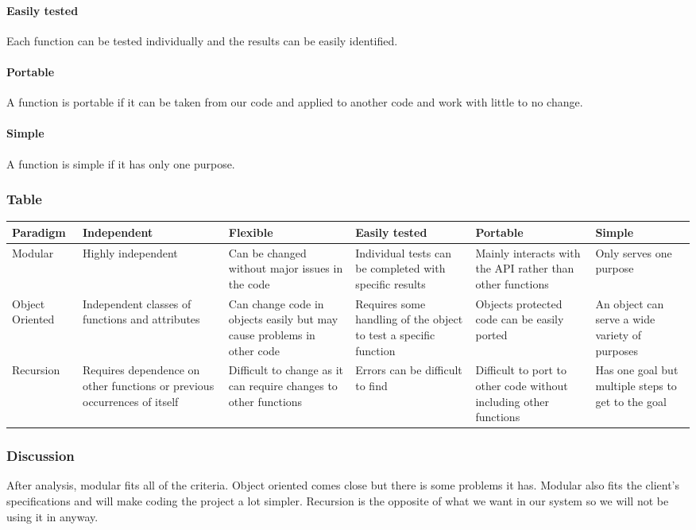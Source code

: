 \documentclass[10pt,letterpaper,onecolumn,draftclsnofoot]{IEEEtran}
\begin{document}
\paragraph{Easily tested}
Each function can be tested individually and the results can be easily identified.

\paragraph{Portable}
A function is portable if it can be taken from our code and applied to another code and work with little to no change.

\paragraph{Simple}
A function is simple if it has only one purpose.

\subsubsection{Table}
\begin{center}
\begin{tabular}{ ||B|M|M|M|M|M|| } 
\hline
Paradigm & Independent & Flexible & Easily tested & Portable & Simple \\
 \hline
 Modular & Highly independent & Can be changed without major issues in the code & Individual tests can be completed with specific results & Mainly interacts with the API rather than other functions & Only serves one purpose\\ 
 \hline
 Object Oriented & Independent classes of functions and attributes & Can change code in objects easily but may cause problems in other code & Requires some handling of the object to test a specific function & Objects protected code can be easily ported & An object can serve a wide variety of purposes\\ 
 \hline
 Recursion & Requires dependence on other functions or previous occurrences of itself & Difficult to change as it can require changes to other functions & Errors can be difficult to find  & Difficult to port to other code without including other functions & Has one goal but multiple steps to get to the goal\\ 
 \hline
\end{tabular}
\end{center}

\subsubsection{Discussion}
After analysis, modular fits all of the criteria. Object oriented comes close but there is some problems it has. Modular also fits the client's specifications and will make coding the project a lot simpler. Recursion is the opposite of what we want in our system so we will not be using it in anyway.
\end{document}
